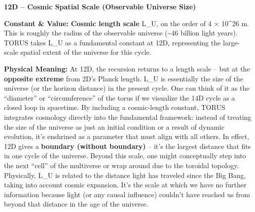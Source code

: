 \documentclass[
]{article}
\begin{document}
{\textbf{12D -- Cosmic Spatial Scale (Observable Universe Size)}

\textbf{Constant \& Value:} \textbf{Cosmic length scale} L\_U, on the
order of 4 × 10\^{}26 m\hspace{0pt}. This is roughly the radius of the
observable universe (\textasciitilde46 billion light years). TORUS takes
L\_U as a fundamental constant at 12D, representing the large-scale
spatial extent of the universe for this cycle.

\textbf{Physical Meaning:} At 12D, the recursion returns to a length
scale -- but at the \textbf{opposite extreme} from 2D's Planck length.
L\_U is essentially the size of the universe (or the horizon distance)
in the present cycle\hspace{0pt}. One can think of it as the
``diameter'' or ``circumference'' of the torus if we visualize the 14D
cycle as a closed loop in spacetime\hspace{0pt}. By including a
cosmic-length constant, TORUS integrates cosmology directly into the
fundamental framework: instead of treating the size of the universe as
just an initial condition or a result of dynamic evolution, it's
enshrined as a parameter that must align with all others. In effect, 12D
gives a \textbf{boundary (without boundary)} -- it's the largest
distance that fits in one cycle of the universe. Beyond this scale, one
might conceptually step into the next ``cell'' of the multiverse or wrap
around due to the toroidal topology. Physically, L\_U is related to the
distance light has traveled since the Big Bang, taking into account
cosmic expansion. It's the scale at which we have no further information
because light (or any causal influence) couldn't have reached us from
beyond that distance in the age of the universe.

}
\end{document}
